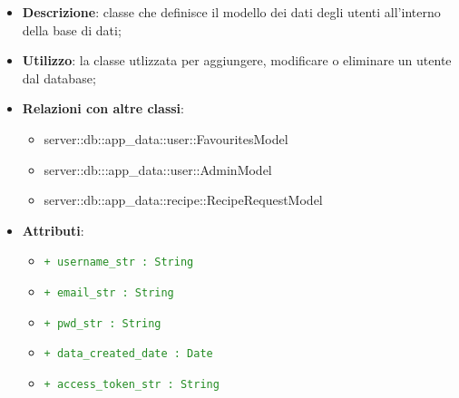 			\begin{itemize}
				\item \textbf{Descrizione}: classe che definisce il modello dei dati degli utenti all'interno della base di dati;
				\item \textbf{Utilizzo}: la classe utlizzata per aggiungere, modificare o eliminare un utente dal database;
				\item \textbf{Relazioni con altre classi}:
					\begin{itemize}
						\item server::db::app\_data::user::FavouritesModel
						\item server::db:::app\_data::user::AdminModel
						\item server::db::app\_data::recipe::RecipeRequestModel
					\end{itemize}
				\item \textbf{Attributi}:
					\begin{itemize}
						\item \textcolor{forestgreen}{\texttt{+ username\_str : String}}
						\item \textcolor{forestgreen}{\texttt{+ email\_str : String}}
						\item \textcolor{forestgreen}{\texttt{+ pwd\_str : String}}
						\item \textcolor{forestgreen}{\texttt{+ data\_created\_date : Date}}
						\item \textcolor{forestgreen}{\texttt{+ access\_token\_str : String}}
\end{itemize}
\end{itemize}
